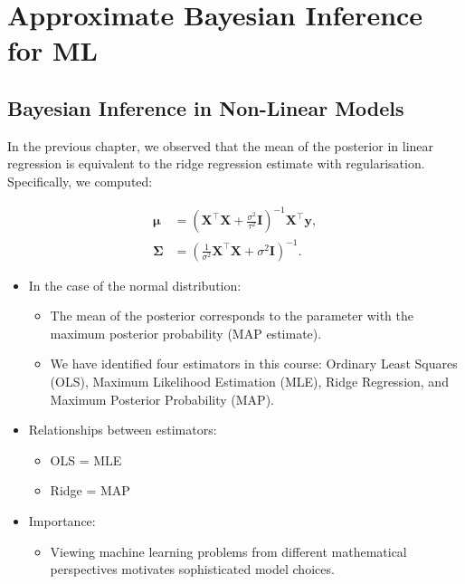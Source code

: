 \chapter{Approximate Bayesian Inference for ML}
\section{Bayesian Inference in Non-Linear Models}

In the previous chapter, we observed that the mean of the posterior in linear regression is equivalent to the ridge regression estimate with regularisation. Specifically, we computed:

\[
    \begin{aligned}
        \boldsymbol{\mu}    & = \left(\boldsymbol{X}^{\top}\boldsymbol{X} + \frac{\sigma^{2}}{\tau^{2}}\mathbf{I}\right)^{-1}\boldsymbol{X}^{\top}\boldsymbol{y}, \\
        \boldsymbol{\Sigma} & = \left(\frac{1}{\sigma^{2}}\boldsymbol{X}^{\top}\boldsymbol{X} + \sigma^{2}\mathbf{I}\right)^{-1}.
    \end{aligned}
\]

\begin{itemize}
    \item In the case of the normal distribution:
          \begin{itemize}
              \item The mean of the posterior corresponds to the parameter with the maximum posterior probability (MAP estimate).
              \item We have identified four estimators in this course: Ordinary Least Squares (OLS), Maximum Likelihood Estimation (MLE), Ridge Regression, and Maximum Posterior Probability (MAP).
          \end{itemize}
    \item Relationships between estimators:
          \begin{itemize}
              \item OLS = MLE
              \item Ridge = MAP
          \end{itemize}
    \item Importance:
          \begin{itemize}
              \item Viewing machine learning problems from different mathematical perspectives motivates sophisticated model choices.
          \end{itemize}
\end{itemize}

